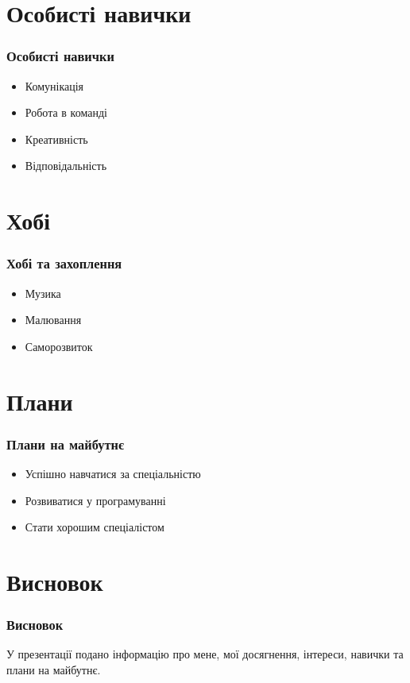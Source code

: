 \documentclass{beamer}
\begin{document}
\section{Особисті навички}
\begin{frame}
\frametitle{Особисті навички}
\begin{itemize}
    \item Комунікація
    \item Робота в команді
    \item Креативність
    \item Відповідальність
\end{itemize}
\end{frame}

\section{Хобі}
\begin{frame}
\frametitle{Хобі та захоплення}
\begin{itemize}
    \item Музика
    \item Малювання
    \item Саморозвиток
\end{itemize}
\end{frame}

\section{Плани}
\begin{frame}
\frametitle{Плани на майбутнє}
\begin{itemize}
    \item Успішно навчатися за спеціальністю
    \item Розвиватися у програмуванні
    \item Стати хорошим спеціалістом
\end{itemize}
\end{frame}

\section{Висновок}
\begin{frame}
\frametitle{Висновок}
У презентації подано інформацію про мене, мої досягнення, інтереси, навички та плани на майбутнє.
\end{frame}
\end{document}
